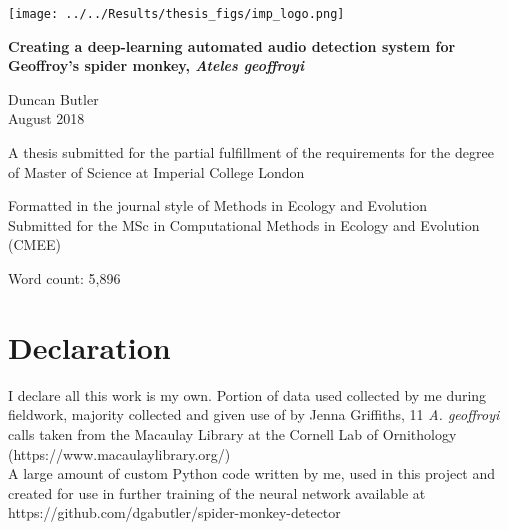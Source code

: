 \documentclass[11pt]{article}
\begin{document}
	
\begin{titlepage}
	
	\newcommand{\HRule}{\rule{\linewidth}{0.5mm}} %
	
	\texttt{[image: ../../Results/thesis\_figs/imp\_logo.png]}\\[1cm]
	
	\center %
	
	\vspace*{1cm}
	
	{ \huge \bfseries Creating a deep-learning automated audio detection system for Geoffroy's spider monkey, \textit{Ateles geoffroyi}}\\ 
	
	\vspace*{3cm}
	
	\huge
	Duncan Butler \\
	\LARGE
	August 2018
	
	\vspace*{5cm}
	
	\normalsize
	A thesis submitted for the partial fulfillment of the requirements for the degree\\ of Master of Science at Imperial College London
	
	\vspace*{1.2cm}
	
	Formatted in the journal style of Methods in Ecology and Evolution \\
	
	Submitted for the MSc in Computational Methods in Ecology and Evolution (CMEE) \\
	
	\vspace*{0.4cm}
	
	Word count: 5,896

	
\end{titlepage}
\doublespacing
\section*{Declaration}
I declare all this work is my own. Portion of data used collected by me during fieldwork, majority collected and given use of by Jenna Griffiths, 11 \textit{A. geoffroyi} calls taken from the Macaulay Library at the Cornell Lab of Ornithology (https://www.macaulaylibrary.org/)\\
A large amount of custom Python code written by me, used in this project and created for use in further training of the neural network available at https://github.com/dgabutler/spider-monkey-detector 
\end{document}
